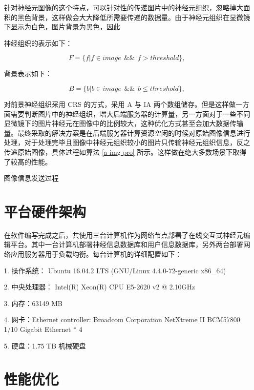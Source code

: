 针对神经元图像的这个特点，可以针对性的传递图片中的神经元组织，忽略掉大面积的黑色背景，这样做会大大降低所需要传递的数据量。由于神经元组织在显微镜下显示为白色，图片背景为黑色，因此

神经组织的表示如下：

$$F = \{f | f \in image ~~ \&\& ~~ f > threshold\},$$

背景表示如下：

$$B = \{b | b \in image ~~ \&\& ~~ b \leq threshold\},$$

对前景神经组织采用 CRS 的方式，采用 A 与 IA 两个数组储存。但是这样做一方面需要判断图片中的神经组织，增大后端服务器的计算量，另一方面对于一些不同显微镜下的图片神经元在图像中的比例较大，这种优化方式甚至会加大数据传输量。最终采取的解决方案是在后端服务器计算资源空闲的时候对原始图像信息进行处理，对于处理完毕且图像中神经元组织较小的图片只传输神经元组织信息，反之传递原始图像，具体过程如算法 \ref{a-img-pro} 所示。这样做在绝大多数场景下取得了较高的性能。

\begin{algorithm}
  \caption{图像信息发送过程}
  \begin{algorithmic}[1]
    \ELSE
      \ENDIF
    \ENDIF
  \end{algorithmic}
  \label{a-img-pro}
\end{algorithm}

\section{平台硬件架构}
在软件编写完成之后，共使用三台计算机作为网络节点部署了在线交互式神经元编辑平台。其中一台计算机部署神经信息数据库和用户信息数据库，另外两台部署网络应用服务器用于负载均衡。每台计算机的详细配置如下：

1. 操作系统： Ubuntu 16.04.2 LTS (GNU/Linux 4.4.0-72-generic x86\_64)

2. 中央处理器： Intel(R) Xeon(R) CPU E5-2620 v2 @ 2.10GHz

3. 内存：63149 MB

4. 网卡：Ethernet controller: Broadcom Corporation NetXtreme II BCM57800 1/10 Gigabit Ethernet * 4

5. 硬盘：1.75 TB 机械硬盘

\section{性能优化}


